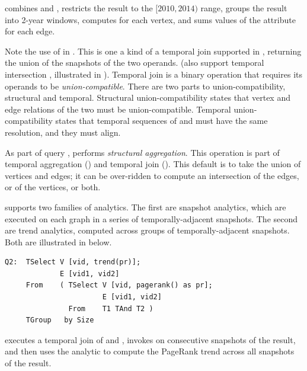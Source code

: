  combines \tgs {} and , restricts the
result to the $[2010, 2014)$ range, groups the result into 2-year
  windows, computes  for each vertex, and sums
  values of the attribute  for each edge.

Note the use of  in .  This is one a kind of a
temporal join supported in \ql, returning the union of the snapshots
of the two operands.  (\ql also support temporal intersection
, illustrated in ).  Temporal join is a binary
operation that requires its operands to be {\em union-compatible}.
There are two parts to \tg union-compatibility, structural and
temporal.  Structural union-compatibility states that vertex and edge
relations of the two \tgs must be union-compatible.  Temporal
union-compatibility states that temporal sequences of  and
 must have the same resolution, and they must align. 

As part of query , \ql performs {\em structural
  aggregation}.  This operation is part of temporal aggregation
() and temporal join ().  This default is to
take the union of vertices and edges; it can be over-ridden to compute
an intersection of the edges, or of the vertices, or both.

\ql supports two families of analytics.  The first are snapshot
analytics, which are executed on each graph in a series of
temporally-adjacent snapshots.  The second are trend analytics,
computed across groups of temporally-adjacent snapshots.  Both are
illustrated in  below.

{\footnotesize
\begin{verbatim}
Q2:  TSelect V [vid, trend(pr)];
             E [vid1, vid2]  
     From    ( TSelect V [vid, pagerank() as pr];   
                       E [vid1, vid2]
               From    T1 TAnd T2 )
     TGroup   by Size
\end{verbatim}
}

 executes a temporal join of  and ,
invokes  on consecutive snapshots of the result, and
then uses the  analytic to compute the PageRank trend
across all snapshots of the result.

